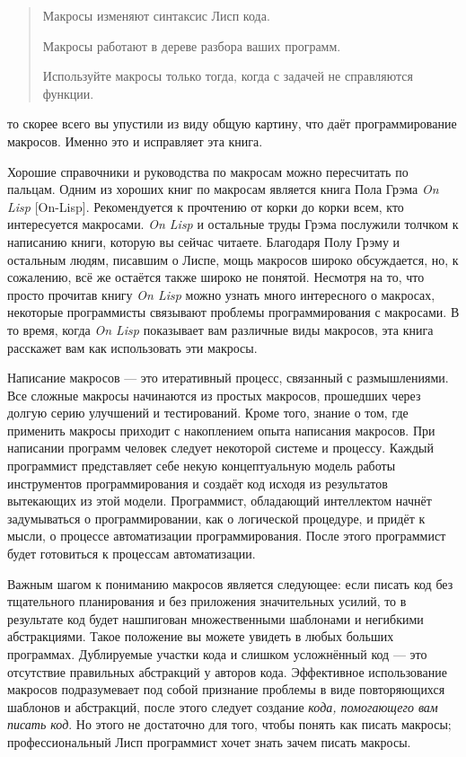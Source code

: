 \begin{quote}
Макросы изменяют синтаксис Лисп кода.

Макросы работают в дереве разбора ваших программ.

Используйте макросы только тогда, когда с задачей не справ\-ляются функции.
\end{quote}
то скорее всего вы упустили из виду общую картину, что даёт прог\-рам\-ми\-ро\-вание макросов. Именно это и исправляет эта книга.

Хорошие справочники и руководства по макросам можно пересчитать по пальцам. Одним из хороших книг по макросам является книга Пола Грэма \emph{On Lisp} [On-Lisp]. Рекомендуется к прочтению от корки до корки всем, кто интересуется макросами. \emph{On Lisp} и остальные труды Грэма послужили толчком к написанию книги, которую вы сейчас читаете. Благодаря Полу Грэму и остальным людям, писавшим о Лиспе, мощь макросов широко обсуждается, но, к сожалению, всё же остаётся также широко не понятой. Несмотря на то, что просто прочитав книгу \emph{On Lisp} можно узнать много интересного о макросах, некоторые программисты связывают проблемы программирования с макросами. В то время, когда \emph{On Lisp} показывает вам различные виды макросов, эта книга расскажет вам как использовать эти макросы.

Написание макросов --- это итеративный процесс, связанный с раз\-мыш\-ле\-ниями. Все сложные макросы начинаются из простых макросов, прошедших через долгую серию улучшений и тестирований. Кроме того, знание о том, где применить макросы приходит с накоплением опыта написания макросов. При написании программ человек следует не\-ко\-торой системе и процессу. Каждый программист представляет себе не\-кую концептуальную модель работы инструментов программирования и создаёт код исходя из результатов вытекающих из этой модели. Про\-грам\-мист, обладающий интеллектом начнёт задумываться о прог\-рам\-ми\-ро\-ва\-нии, как о логической процедуре, и придёт к мысли, о процессе автоматизации программирования. После этого программист будет го\-то\-ви\-ться к процессам автоматизации.

Важным шагом к пониманию макросов является следующее: если писать код без тщательного планирования и без приложения зна\-чи\-те\-льных усилий, то в результате код будет нашпигован множественными шаблонами и негибкими абс\-трак\-циями. Такое положение вы можете увидеть в любых больших программах. Дублируемые участки кода и слишком усложнённый код --- это отсутствие правильных абстракций у авторов кода. Эффективное использование макросов подразумевает под собой признание проблемы в виде повторяющихся шаблонов и абс\-трак\-ций, после этого следует создание \emph{кода, помогающего вам писать код}. Но этого не достаточно для того, чтобы понять как писать макросы; профессиональный Лисп программист хочет знать зачем писать мак\-ро\-сы.

